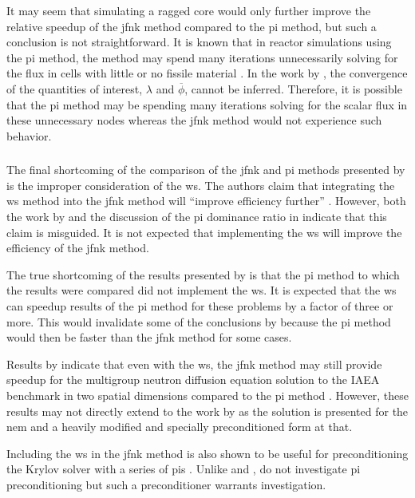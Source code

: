       It may seem that simulating a ragged core would only further improve the
      relative speedup of the \gls{jfnk} method compared to the \gls{pi} method,
      but such a conclusion is not straightforward. It is known that in reactor
      simulations using the \gls{pi} method, the method may spend many
      iterations unnecessarily solving for the flux in cells with little or no
      fissile material \cite{gehinThesis}. In the work by \citeauthor{qe2paper},
      the convergence of the quantities of interest, $\lambda$ and
      $\overline{\phi}$, cannot be inferred. Therefore, it is possible that the
      \gls{pi} method may be spending many iterations solving for the scalar
      flux in these unnecessary nodes whereas the \gls{jfnk} method would not
      experience such behavior.

    \subsubsection{}
    \label{sec:wielandt_shift}

      The final shortcoming of the comparison of the \gls{jfnk} and \gls{pi}
      methods presented by \citeauthor{qe2paper} is the improper consideration
      of the \gls{ws}. The authors claim that integrating the \gls{ws} method
      into the \gls{jfnk} method will ``improve efficiency further''
      \cite{qe2paper}. However, both the work by \citeauthor{gill_azmy} and the
      discussion of the \gls{pi} dominance ratio in 
      indicate that this claim is misguided. It is not expected that
      implementing the \gls{ws} will improve the efficiency of the \gls{jfnk}
      method.

      The true shortcoming of the results presented by \citeauthor{qe2paper} is
      that the \gls{pi} method to which the results were compared did not
      implement the \gls{ws}. It is expected that the \gls{ws} can speedup
      results of the \gls{pi} method for these problems by a factor of three or
      more. This would invalidate some of the conclusions by
      \citeauthor{qe2paper} because the \gls{pi} method would then be faster
      than the \gls{jfnk} method for some cases.

      Results by \citeauthor{jfnk_wielandt} indicate that even with the
      \gls{ws}, the \gls{jfnk} method may still provide speedup for the
      multigroup neutron diffusion equation solution to the IAEA benchmark in
      two spatial dimensions compared to the \gls{pi} method
      \cite{jfnk_wielandt}. However, these results may not directly extend to
      the work by \citeauthor{qe2paper} as the solution is presented for the
      \gls{nem} and a heavily modified and specially preconditioned form at
      that.

      Including the \gls{ws} in the \gls{jfnk} method is also shown to be useful
      for preconditioning the Krylov solver with a series of \glspl{pi}
      \cite{jfnk_wielandt}. Unlike \citeauthor{gill_azmy} and
      \citeauthor{jfnk_wielandt}, \citeauthor{qe2paper} do not investigate
      \gls{pi} preconditioning but such a preconditioner warrants investigation.

